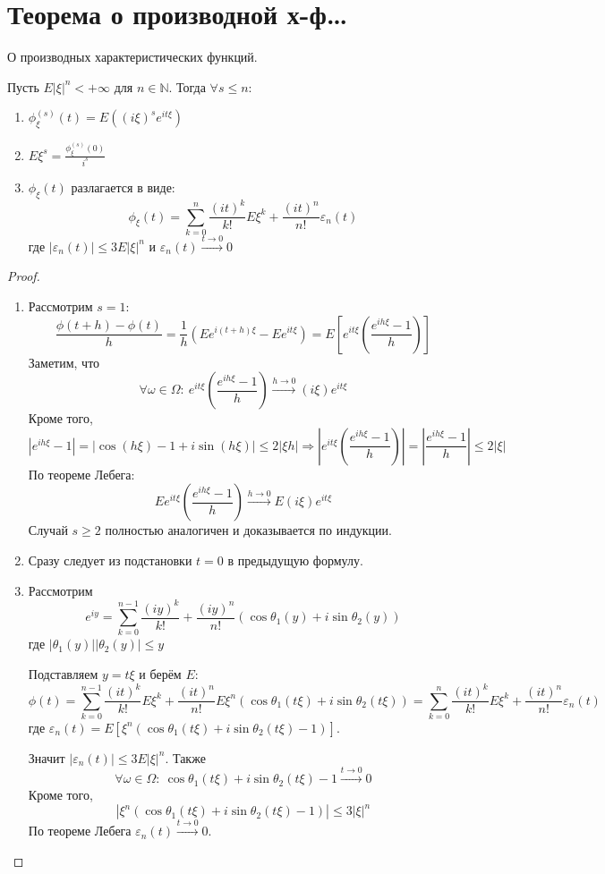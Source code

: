 \section{Теорема о производной х-ф\dots}
\begin{theorem}
	О производных характеристических функций.

	Пусть $E|\xi|^n < +\infty$ для $n \in \mathbb{N}$. Тогда $\forall s \leq n$:
	\begin{enumerate}
		\item $\phi_\xi^{(s)}(t) = E\left((i\xi)^se^{it\xi}\right)$
		\item $E\xi^s = \frac{\phi^{(s)}_\xi(0)}{i^s}$
		\item $\phi_\xi(t)$ разлагается в виде:
		      \[\phi_\xi(t) = \sum_{k = 0}^n \frac{(it)^k}{k!}E\xi^k + \frac{(it)^n}{n!}\varepsilon_n(t)\]
		      где $|\varepsilon_n(t)| \leq 3E|\xi|^n$ и $\varepsilon_n(t) \stackrel{t \to 0}{\to} 0$
	\end{enumerate}
\end{theorem}

\begin{proof}
	\begin{enumerate}
		\item Рассмотрим $s = 1$:
		      \[\frac{\phi(t + h) - \phi(t)}{h} = \frac{1}{h}(Ee^{i(t + h)\xi} - Ee^{it\xi}) = E\left[e^{it\xi}\left(\frac{e^{ih\xi} - 1}{h}\right)\right]\]
		      Заметим, что
		      \[\forall \omega \in \Omega:\: e^{it\xi}\left(\frac{e^{ih\xi} - 1}{h}\right)\stackrel{h \to 0}{\to} (i\xi)e^{it\xi}\]
		      Кроме того,
		      \[|e^{ih\xi} - 1| = |\cos(h\xi) - 1 + i\sin(h\xi)| \leq 2|\xi h| \Rightarrow  \left|e^{it\xi}\left(\frac{e^{ih\xi} - 1}{h}\right)\right| = \left|\frac{e^{ih\xi} - 1}{h}\right| \leq 2|\xi|\]
		      По теореме Лебега:
		      \[Ee^{it\xi}\left(\frac{e^{ih\xi} - 1}{h}\right) \stackrel{h \to 0}{\to} E(i\xi)e^{it\xi}\]
		      Случай $s \geq 2$ полностью аналогичен и доказывается по индукции.
		\item Сразу следует из подстановки $t = 0$ в предыдущую формулу.
		\item Рассмотрим
		      \[e^{iy} = \sum_{k = 0}^{n - 1}\frac{(iy)^k}{k!} + \frac{(iy)^n}{n!}(\cos\theta_1(y) + i\sin\theta_2(y))\]
		      где $|\theta_1(y)||\theta_2(y)| \leq y$

		      Подставляем $y = t\xi$ и берём $E$:
		      \[\phi(t) = \sum_{k = 0}^{n - 1}\frac{(it)^k}{k!}E\xi^k + \frac{(it)^n}{n!}E\xi^n(\cos\theta_1(t\xi) + i\sin\theta_2(t\xi)) = \sum_{k = 0}^n \frac{(it)^k}{k!}E\xi^k + \frac{(it)^n}{n!}\varepsilon_n(t)\]
		      где $\varepsilon_n(t) = E[\xi^n(\cos\theta_1(t\xi) + i\sin\theta_2(t\xi) - 1)]$.

		      Значит $|\varepsilon_n(t)| \leq 3E|\xi|^n$. Также
		      \[\forall \omega \in \Omega:\: \cos\theta_1(t\xi) + i\sin\theta_2(t\xi) - 1 \stackrel{t \to 0}{\to} 0\]
		      Кроме того,
		      \[|\xi^n( \cos\theta_1(t\xi) + i\sin\theta_2(t\xi) - 1)| \leq 3|\xi|^n\]
		      По теореме Лебега $\varepsilon_n(t) \stackrel{t \to 0}{\to} 0$.
	\end{enumerate}
\end{proof}

